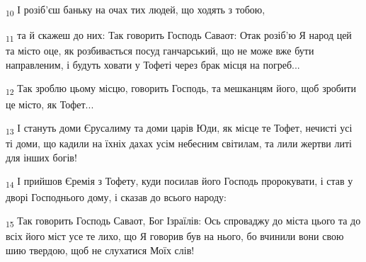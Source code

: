 \begin{tcolorbox}
\textsubscript{10} І розіб'єш баньку на очах тих людей, що ходять з тобою,
\end{tcolorbox}
\begin{tcolorbox}
\textsubscript{11} та й скажеш до них: Так говорить Господь Саваот: Отак розіб'ю Я народ цей та місто оце, як розбивається посуд ганчарський, що не може вже бути направленим, і будуть ховати у Тофеті через брак місця на погреб...
\end{tcolorbox}
\begin{tcolorbox}
\textsubscript{12} Так зроблю цьому місцю, говорить Господь, та мешканцям його, щоб зробити це місто, як Тофет...
\end{tcolorbox}
\begin{tcolorbox}
\textsubscript{13} І стануть доми Єрусалиму та доми царів Юди, як місце те Тофет, нечисті усі ті доми, що кадили на їхніх дахах усім небесним світилам, та лили жертви литі для інших богів!
\end{tcolorbox}
\begin{tcolorbox}
\textsubscript{14} І прийшов Єремія з Тофету, куди посилав його Господь пророкувати, і став у дворі Господнього дому, і сказав до всього народу:
\end{tcolorbox}
\begin{tcolorbox}
\textsubscript{15} Так говорить Господь Саваот, Бог Ізраїлів: Ось спроваджу до міста цього та до всіх його міст усе те лихо, що Я говорив був на нього, бо вчинили вони свою шию твердою, щоб не слухатися Моїх слів!
\end{tcolorbox}
